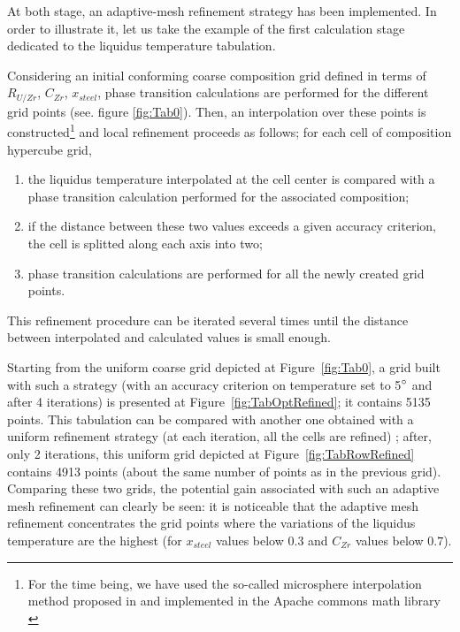 \documentclass[11pt]{article}\usepackage{geometry} \geometry{letterpaper, margin=25.4mm}
\newcommand{\Fig}[1]{Figure~\ref{fig:#1}}
\begin{document}
At both stage, an adaptive-mesh refinement strategy has been implemented. In order to illustrate it, let us take the example of the first calculation stage dedicated to the liquidus temperature tabulation. 

Considering an initial conforming coarse composition grid defined in terms of $R_{U/Zr}$, $C_{Zr}$, $x_{steel}$, phase transition calculations are performed for the different grid points (see. figure \ref{fig:Tab0}). Then, an interpolation over these points is constructed\footnote{For the time being, we have used the so-called microsphere interpolation method proposed in \cite{Dudziak2007} and implemented in the Apache commons math library \cite{Apache2016}} and local refinement proceeds as follows; for each cell of composition hypercube grid,
\begin{enumerate}
 \item the liquidus temperature interpolated at the cell center is compared with a phase transition calculation performed for the associated composition;
 \item if the distance between these two values exceeds a given accuracy criterion, the cell is splitted along each axis into two;
 \item phase transition calculations are performed for all the newly created grid points.
\end{enumerate}
This refinement procedure can be iterated several times until the distance between interpolated and calculated values is small enough. 

Starting from the uniform coarse grid depicted at \Fig{Tab0}, a grid built with such a strategy (with an accuracy criterion on temperature set to 5$\degree$ and after 4 iterations) is presented at \Fig{TabOptRefined}; it contains 5135 points. This tabulation can be compared with another one obtained with a uniform refinement strategy (at each iteration, all the cells are refined) ; after, only 2 iterations, this uniform grid depicted at \Fig{TabRowRefined} contains 4913 points (about the same number of points as in the previous grid). Comparing these two grids, the potential gain associated with such an adaptive mesh refinement can clearly be seen: it is noticeable that the adaptive mesh refinement concentrates the grid points where the variations of the liquidus temperature are the highest (for $x_{steel}$ values below $0.3$ and $C_{Zr}$ values below $0.7$). 
\end{document}
